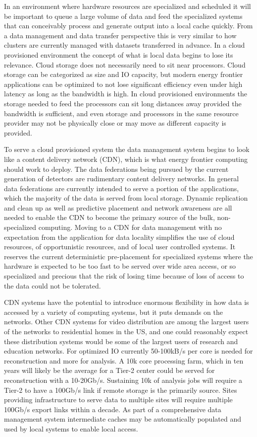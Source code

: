 In an environment where hardware resources are specialized and scheduled it will be important to queue a large volume of data and feed the specialized systems that can conceivably process and generate output into a local cache quickly.   From a data management and data transfer perspective this is very similar to how clusters are currently managed with datasets transferred in advance.    In a cloud provisioned environment the concept of what is local data begins to lose its relevance.    Cloud storage does not necessarily need to sit near processors.   Cloud storage can be categorized as size and IO capacity, but modern energy frontier applications can be optimized to not lose significant efficiency even under high latency as long as the bandwidth is high.    In cloud provisioned environments the storage needed to feed the processors can sit long distances away provided the bandwidth is sufficient, and even storage and processors in the same resource provider may not be physically close or may move as different capacity is provided.   

To serve a cloud provisioned system the data management system begins to look like a content delivery network (CDN), which is what energy frontier computing should work to deploy.   The data federations being pursued by the current generation of detectors are rudimentary content delivery networks.    In general data federations are currently intended to serve a portion of the applications, which the majority of the data is served from local storage.   Dynamic replication and clean up as well as predictive placement and network awareness are all needed to enable the CDN to become the primary source of the bulk, non-specialized computing.    Moving to a CDN for data management with no expectation from the application for data locality simplifies the use of cloud resources, of opportunistic resources, and of local user controlled systems.    It reserves the current deterministic pre-placement for specialized systems where the hardware is expected to be too fast to be served over wide area access, or so specialized and precious that the risk of losing time because of loss of access to the data could not be tolerated.   

CDN systems have the potential to introduce enormous flexibility in how data is accessed by a variety of computing systems, but it puts demands on the networks.   Other CDN systems for video distribution are among the largest users of the networks to residential homes in the US, and one could reasonably expect these distribution systems would be some of the largest users of research and education networks.   For optimized IO currently 50-100kB/s per core is needed for reconstruction and more for analysis.   A 10k core processing farm, which in ten years will likely be the average for a Tier-2 center could be served for reconstruction with a 10-20Gb/s.    Sustaining 10k of analysis jobs will require a Tier-2 to have a 100Gb/s link if remote storage is the primarily source.   Sites providing infrastructure to serve data to multiple sites will require multiple 100Gb/s export links within a decade.  As part of a comprehensive data management system intermediate caches may be automatically populated and used by local systems to enable local access.   

